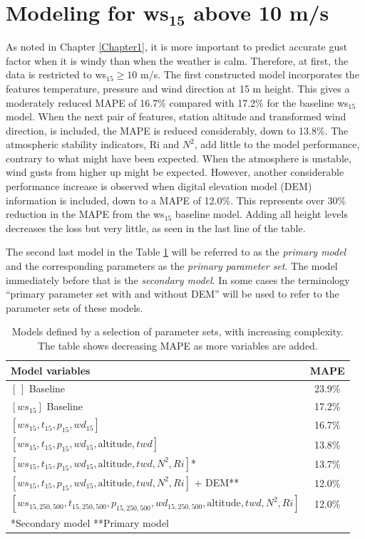 \section{Modeling for ws$_{\textbf{15}}$ above 10 m/s}
As noted in Chapter \ref{Chapter1}, it is more important to predict accurate gust factor when it is windy than when the weather is calm. Therefore, at first, the data is restricted to ws$_{15} \geq 10$ m/s. The first constructed model incorporates the features temperature, pressure and wind direction at 15 m height. This gives a moderately reduced MAPE of 16.7\% compared with 17.2\% for the baseline ws$_{15}$ model. When the next pair of features, station altitude and transformed wind direction, is included, the MAPE is reduced considerably, down to 13.8\%. The atmospheric stability indicators, Ri and $N^2$, add little to the model performance, contrary to what might have been expected. When the atmosphere is unstable, wind gusts from higher up might be expected. However, another considerable performance increase is observed when digital elevation model (DEM) information is included, down to a MAPE of 12.0\%. This represents over 30\% reduction in the MAPE from the ws$_{15}$ baseline model. Adding all height levels decreases the loss but very little, as seen in the last line of the table.

The second last model in the Table \ref{table:setsOfParams} will be referred to as the \textit{primary model} and the corresponding parameters as the \textit{primary parameter set}. The model immediately before that is the \textit{secondary model}. In some cases the terminology ``primary parameter set with and without DEM'' will be used to refer to the parameter sets of these models.

\begin{table}[h]
  \caption[Model results for different sets of parameters.]{Models defined by a selection of parameter sets, with increasing complexity. The table shows decreasing MAPE as more variables are added.}
    \label{table:setsOfParams}
    \centering
    \begin{tabular}{lc}
        \toprule
        Model variables & MAPE\\
        \midrule
        $[\,]$ Baseline & 23.9\%\\
        $[ws_{15}]$ Baseline & 17.2\%\\
        $[ws_{15}, t_{15}, p_{15}, wd_{15}]$ & 16.7\% \\
        $[ws_{15}, t_{15}, p_{15}, wd_{15}, \text{altitude}, twd]$ & 13.8\% \\
        $[ws_{15}, t_{15}, p_{15}, wd_{15}, \text{altitude}, twd, N^2, Ri]$* & 13.7\%\\
        $[ws_{15}, t_{15}, p_{15}, wd_{15}, \text{altitude}, twd, N^2, Ri]$ + DEM** & 12.0\%\\
        $[ws_{15,250,500}, t_{15,250,500}, p_{15,250,500}, wd_{15,250,500}, \text{altitude}, twd, N^2, Ri]$ & 12.0\% \\
        \bottomrule
        *\small{Secondary model}
        **\small{Primary model}
    \end{tabular}
\end{table}


